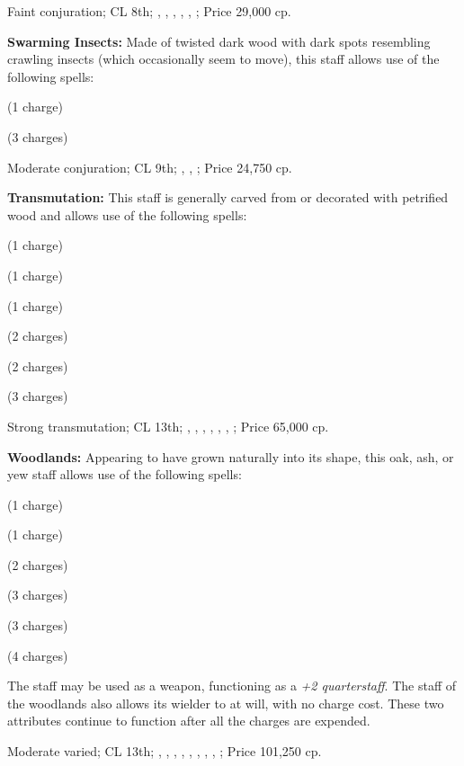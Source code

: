 Faint conjuration; CL 8th; , , , , , ; Price 29,000 cp.

\textbf{Swarming Insects:} Made of twisted dark wood with dark spots resembling crawling insects (which occasionally seem to move), this staff allows use of the following spells:
\begin{itemize*}
\item {} (1 charge)
\item {} (3 charges)
\end{itemize*}

Moderate conjuration; CL 9th; , , ; Price 24,750 cp.

\textbf{Transmutation:} This staff is generally carved from or decorated with petrified wood and allows use of the following spells:
\begin{itemize*}
\item {} (1 charge)
\item {} (1 charge)
\item {} (1 charge)
\item {} (2 charges)
\item {} (2 charges)
\item {} (3 charges)
\end{itemize*}

Strong transmutation; CL 13th; , , , , , , ; Price 65,000 cp.

\textbf{Woodlands:} Appearing to have grown naturally into its shape, this oak, ash, or yew staff allows use of the following spells:
\begin{itemize*}
\item {} (1 charge)
\item {} (1 charge)
\item {} (2 charges)
\item {} (3 charges)
\item {} (3 charges)
\item {} (4 charges)
\end{itemize*}

The staff may be used as a weapon, functioning as a \emph{+2 quarterstaff}. The staff of the woodlands also allows its wielder to  at will, with no charge cost. These two attributes continue to function after all the charges are expended.

Moderate varied; CL 13th; , , , , , , , , ; Price 101,250 cp. 